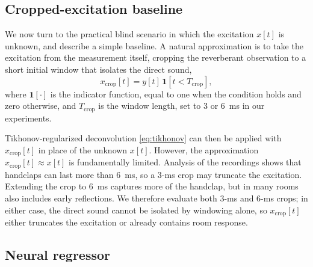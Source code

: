 \documentclass{article}
\begin{document}
\subsection{Cropped-excitation baseline}
\label{sec:excitation}

We now turn to the practical blind scenario in which the excitation $x[t]$ is unknown, and describe a simple baseline.
A natural approximation is to take the excitation from the measurement itself, cropping the reverberant observation to a short initial window that isolates the direct sound,
\begin{equation}
x_{\mathrm{crop}}[t]
=
y[t]\, \mathbf{1}[t<T_\mathrm{crop}],
\label{eq:crop}
\end{equation}
where $\mathbf{1}[\cdot]$ is the indicator function, equal to one when the
condition holds and zero otherwise, and $T_\mathrm{crop}$ is the window
length, set to 3 or 6~ms in our experiments.

Tikhonov-regularized deconvolution \eqref{eq:tikhonov} can then be applied with
$x_\mathrm{crop}[t]$ in place of the unknown $x[t]$. However, the approximation
$x_\mathrm{crop}[t] \approx x[t]$ is fundamentally limited. Analysis of the
recordings shows that handclaps can last more than 6~ms, so a 3-ms crop may
truncate the excitation. Extending the crop to 6~ms captures more of the
handclap, but in many rooms also includes early reflections. We therefore
evaluate both 3-ms and 6-ms crops; in either case, the direct sound cannot be
isolated by windowing alone, so $x_\mathrm{crop}[t]$ either truncates the
excitation or already contains room response.







\subsection{Neural regressor}

\end{document}
